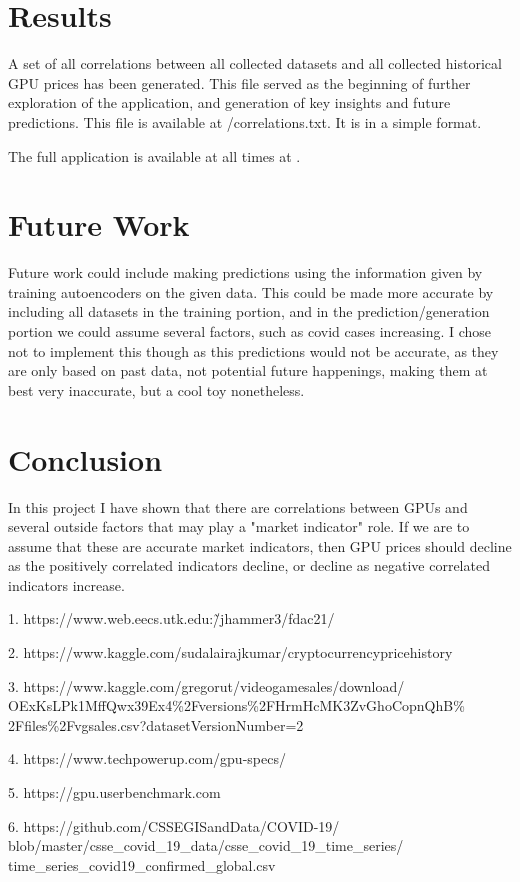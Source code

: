 \documentclass[twocolumn]{article}
\begin{document}
\section{Results}
A set of all correlations between all collected datasets and all collected historical GPU prices has been generated. This file served as the beginning of further exploration of the application, and generation of key insights and future predictions. This file is available at /correlations.txt. It is in a simple format.

The full application is available at all times at \cite{jhammer3}. 

\section{Future Work}
Future work could include making predictions using the information given by training autoencoders on the given data. This could be made more accurate by including all datasets in the training portion, and in the prediction/generation portion we could assume several factors, such as covid cases increasing. I chose not to implement this though as this predictions would not be accurate, as they are only based on past data, not potential future happenings, making them at best very inaccurate, but a cool toy nonetheless. 

\section{Conclusion}
In this project I have shown that there are correlations between GPUs and several outside factors that may play a "market indicator" role. If we are to assume that these are accurate market indicators, then GPU prices should decline as the positively correlated indicators decline, or decline as negative correlated indicators increase.

\begin{thebibliography}{99}

 1. https://www.web.eecs.utk.edu:\~/jhammer3/fdac21/ 

 2.  https://www.kaggle.com/sudalairajkumar/cryptocurrencypricehistory

 3.  https://www.kaggle.com/gregorut/videogamesales/download/ OExKsLPk1MffQwx39Ex4\%2Fversions\%2FHrmHcMK3ZvGhoCopnQhB\% 2Ffiles\%2Fvgsales.csv?datasetVersionNumber=2

 4. https://www.techpowerup.com/gpu-specs/

 5. https://gpu.userbenchmark.com

 6. https://github.com/CSSEGISandData/COVID-19/ blob/master/csse\_covid\_19\_data/csse\_covid\_19\_time\_series/ time\_series\_covid19\_confirmed\_global.csv

\end{thebibliography}
\end{document}
